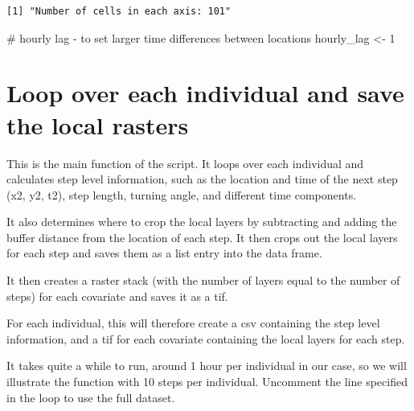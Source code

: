 \documentclass[
  letterpaper,
  DIV=11,
  numbers=noendperiod]{scrartcl}
\newenvironment{Shaded}{\begin{snugshade}}{\end{snugshade}}
\newcommand{\CommentTok}[1]{\textcolor[rgb]{0.37,0.37,0.37}{#1}}
\newcommand{\DecValTok}[1]{\textcolor[rgb]{0.68,0.00,0.00}{#1}}
\newcommand{\NormalTok}[1]{\textcolor[rgb]{0.00,0.23,0.31}{#1}}
\newcommand{\OtherTok}[1]{\textcolor[rgb]{0.00,0.23,0.31}{#1}}
\begin{document}
\begin{verbatim}
[1] "Number of cells in each axis: 101"
\end{verbatim}

\begin{Shaded}
\begin{Highlighting}[]
\CommentTok{\# hourly lag {-} to set larger time differences between locations}
\NormalTok{hourly\_lag }\OtherTok{\textless{}{-}} \DecValTok{1}
\end{Highlighting}
\end{Shaded}

\section{Loop over each individual and save the local
rasters}\label{loop-over-each-individual-and-save-the-local-rasters}

This is the main function of the script. It loops over each individual
and calculates step level information, such as the location and time of
the next step (x2, y2, t2), step length, turning angle, and different
time components.

It also determines where to crop the local layers by subtracting and
adding the buffer distance from the location of each step. It then crops
out the local layers for each step and saves them as a list entry into
the data frame.

It then creates a raster stack (with the number of layers equal to the
number of steps) for each covariate and saves it as a tif.

For each individual, this will therefore create a csv containing the
step level information, and a tif for each covariate containing the
local layers for each step.

It takes quite a while to run, around 1 hour per individual in our case,
so we will illustrate the function with 10 steps per individual.
Uncomment the line specified in the loop to use the full dataset.
\end{document}

